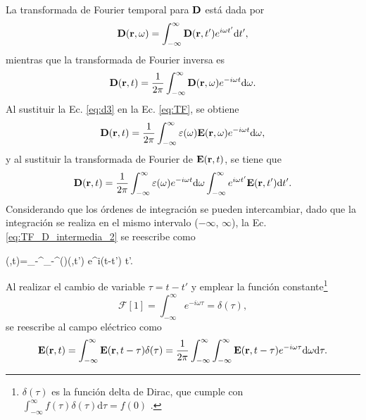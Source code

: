 La transformada de Fourier temporal para $\vb{D}$ está dada por~\cite{jacksonClassicalElectrodynamics2021a}
%
\begin{equation}
	\vb{D}(\vb{r},\omega)=\int_{-\infty}^{\infty}\vb{D}(\vb{r},t')e^{i\omega t'}\text{d}t',\label{eq:TFI}
\end{equation}
%
mientras que la transformada de Fourier inversa es
%
\begin{equation}
	\vb{D}(\vb{r},t)=\frac{1}{2\pi}\int_{-\infty}^{\infty}\vb{D}(\vb{r},\omega)e^{-i\omega t}\text{d}\omega.\label{eq:TF}
\end{equation}
%
Al sustituir la Ec. \eqref{eq:d3} en la Ec. \eqref{eq:TF}, se obtiene
%
\begin{equation}
	\vb{D}(\vb{r},t)=\frac{1}{2\pi}\int_{-\infty}^{\infty}\varepsilon(\omega)\vb{E}(\vb{r},\omega)e^{-i\omega t}\text{d}\omega,\label{eq:TF_D_intermedia_1}
\end{equation}
%
y al sustituir la transformada de Fourier de $\vb{E}(\vb{r},t)$, se tiene que
%
\begin{equation}
	\vb{D}(\vb{r},t)=\frac{1}{2\pi}\int_{-\infty}^{\infty}\varepsilon(\omega)e^{-i\omega t}\text{d}\omega\int_{-\infty}^{\infty}e^{i\omega t'}\vb{E}(\vb{r},t')\text{d}t'.\label{eq:TF_D_intermedia_2}
\end{equation}
%
Considerando que los órdenes de integración se pueden intercambiar, dado que la integración se realiza en el mismo intervalo ($-\infty$, $\infty$), la Ec. \eqref{eq:TF_D_intermedia_2} se reescribe como
%
\begin{tcolorbox}
	(,t)=\int_{-\infty}^{\infty}\int_{-\infty}^{\infty}\varepsilon(\omega)(,t') e^{i\omega (t-t')} \omega {}t'.\label{eq:TF_D_intermedia_3} 
\end{tcolorbox}
%
\noindent Al realizar el cambio de variable $\tau = t - t'$ y emplear la función constante\footnote{$\delta(\tau)$ es la función delta de Dirac, que cumple con $\int_{-\infty}^{\infty}f(\tau)\delta(\tau)\text{d}\tau=f(0)$ \cite{arfkenMathematicalMethodsPhysicists2011a}.}
\begin{equation}
	\mathcal{F}[1]=\int_{-\infty}^{\infty}e^{-i\omega\tau}=\delta(\tau),
\end{equation}
se reescribe al campo eléctrico como
\begin{equation}
	\vb{E}(\vb{r},t)=\int_{-\infty}^{\infty}\vb{E}(\vb{r},t-\tau)\delta(\tau)=\frac{1}{2\pi}\int_{-\infty}^{\infty}\int_{-\infty}^{\infty}\vb{E}(\vb{r},t-\tau)e^{-i\omega\tau}\text{d}\omega\text{d}\tau.
\end{equation}
